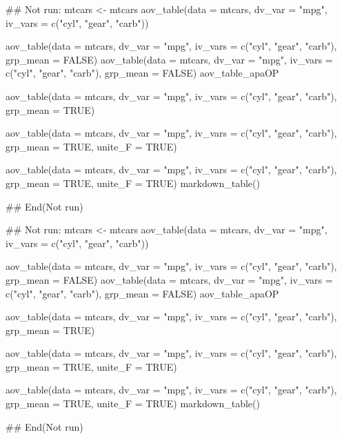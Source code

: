 \documentclass[a4paper]{book}
\begin{document}
\begin{Examples}
\begin{ExampleCode}

\#\# Not run: 
mtcars <- mtcars%
aov_table(data = mtcars, dv_var = "mpg", iv_vars = c("cyl", "gear", "carb"))

aov_table(data = mtcars, dv_var = "mpg",
iv_vars = c("cyl", "gear", "carb"), grp_mean = FALSE)
aov_table(data = mtcars, dv_var = "mpg",
iv_vars = c("cyl", "gear", "carb"), grp_mean = FALSE) %
aov_table_apaOP

aov_table(data = mtcars, dv_var = "mpg",
 iv_vars = c("cyl", "gear", "carb"), grp_mean = TRUE)

aov_table(data = mtcars, dv_var = "mpg",
 iv_vars = c("cyl", "gear", "carb"), grp_mean = TRUE, unite_F = TRUE)

aov_table(data = mtcars, dv_var = "mpg",
 iv_vars = c("cyl", "gear", "carb"),
  grp_mean = TRUE, unite_F = TRUE) %
  markdown_table()

## End(Not run)




\#\# Not run: 
mtcars <- mtcars%
aov_table(data = mtcars, dv_var = "mpg", iv_vars = c("cyl", "gear", "carb"))

aov_table(data = mtcars, dv_var = "mpg",
iv_vars = c("cyl", "gear", "carb"), grp_mean = FALSE)
aov_table(data = mtcars, dv_var = "mpg",
iv_vars = c("cyl", "gear", "carb"), grp_mean = FALSE) %
aov_table_apaOP

aov_table(data = mtcars, dv_var = "mpg",
 iv_vars = c("cyl", "gear", "carb"), grp_mean = TRUE)

aov_table(data = mtcars, dv_var = "mpg",
 iv_vars = c("cyl", "gear", "carb"), grp_mean = TRUE, unite_F = TRUE)

aov_table(data = mtcars, dv_var = "mpg",
 iv_vars = c("cyl", "gear", "carb"),
  grp_mean = TRUE, unite_F = TRUE) %
  markdown_table()

## End(Not run)



\end{ExampleCode}
\end{Examples}
\end{document}
